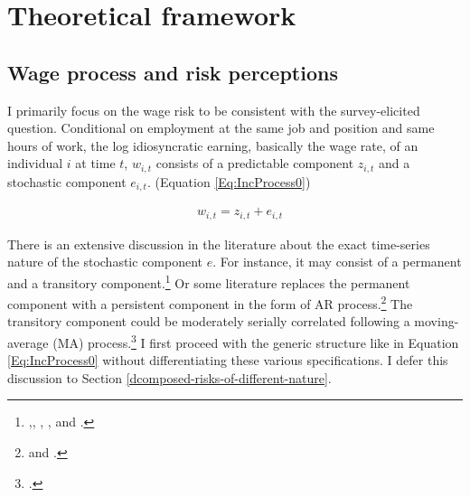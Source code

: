 
    \hypertarget{theoretical-framework}{%
\section{Theoretical framework}\label{theoretical-framework}}

\hypertarget{income-process-and-risk-perceptions}{%
\subsection{Wage process and risk
perceptions}\label{income-process-and-risk-perceptions}}

I primarily focus on the wage risk to be consistent with the survey-elicited question. Conditional on employment at the same job and position and same hours of work, the log idiosyncratic earning, basically the wage rate, of an individual \(i\) at time \(t\), $w_{i,t}$ consists of a predictable component $z_{i,t}$ and a stochastic component $e_{i,t}$. (Equation \ref{Eq:IncProcess0}) %


\begin{equation}
\begin{split}
\label{Eq:IncProcess0}
& w_{i,t} = z_{i,t}+ e_{i,t} 
\end{split}
\end{equation}

There is an extensive discussion in the literature about the exact time-series nature of the stochastic component $e$. For instance, it may consist of a permanent and a transitory component.\footnote{\cite{abowd1989covariance},\cite{gottschalk1994growth}, \cite{carroll1997nature}, \cite{blundell_consumption_2008}, and \cite{kaplan2010much}.} Or some literature replaces the permanent component with a persistent component in the form of AR process.\footnote{\cite{storesletten2004cyclical} and \cite{guvenen_empirical_2009}.} The transitory component could be moderately serially correlated following a moving-average (MA) process.\footnote{\cite{meghir2004income}.} I first proceed with the generic structure like in Equation \ref{Eq:IncProcess0} without differentiating these various specifications. I defer this discussion to Section \ref{dcomposed-risks-of-different-nature}. 


